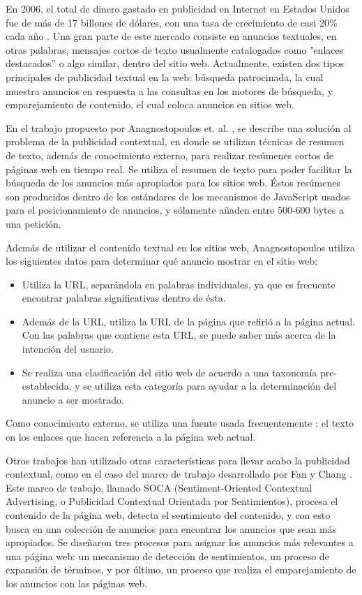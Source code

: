 En 2006, el total de dinero gastado en publicidad en Internet en
Estados Unidos fue de más de 17 billones de dólares, con una tasa de crecimiento de casi 20\%
cada año \cite{anagnostopoulos2007just}. Una gran parte de este
mercado consiste en anuncios textuales, en otras palabras, mensajes
cortos de texto usualmente catalogados como "enlaces destacados'' o
algo similar, dentro del sitio web. Actualmente, existen dos tipos
principales de publicidad textual en la web: búsqueda patrocinada, la
cual muestra anuncios en respuesta a las consultas en los motores de
búsqueda, y emparejamiento de contenido, el cual coloca anuncios en
sitios web.

En el trabajo propuesto por Anagnostopoulos
et. al. \cite{anagnostopoulos2007just}, se describe una solución al
problema de la publicidad contextual, en donde se utilizan técnicas de
resumen de texto, además de conocimiento externo, para realizar
resúmenes cortos de páginas web en tiempo real. Se utiliza el resumen
de texto para poder facilitar la búsqueda de los anuncios más
apropiados para los sitios web. Éstos resúmenes son producidos dentro
de los estándares de los mecanismos de JavaScript usados para el
posicionamiento de anuncios, y sólamente añaden entre 500-600 bytes a
una petición.

Además de utilizar el contenido textual en los sitios web,
Anagnostopoulos utiliza los siguientes datos para determinar qué
anuncio mostrar en el sitio web:

\begin{itemize}
  \item Utiliza la URL, separándola en palabras individuales, ya que
    es frecuente encontrar palabras significativas dentro de ésta.
  \item Además de la URL, utiliza la URL de la página que refirió a la
    página actual. Con las palabras que contiene esta URL, se puede
    saber más acerca de la intención del usuario.
  \item Se realiza una clasificación del sitio web de acuerdo a una
    taxonomía pre-establecida, y se utiliza esta categoría para ayudar
    a la determinación del anuncio a ser mostrado.
\end{itemize}

Como conocimiento externo, se utiliza una fuente usada frecuentemente \cite{brin1998anatomy}:
el texto en los enlaces que hacen referencia a la página web actual.

Otros trabajos han utilizado otras características para llevar acabo
la publicidad contextual, como en el caso del marco de trabajo
desarrollado por Fan y Chang \cite{fan2010sentiment}. Este marco de
trabajo, llamado SOCA (Sentiment-Oriented Contextual Advertising, o
Publicidad Contextual Orientada por Sentimientos), procesa el
contenido de la página web, detecta el sentimiento del contenido, y con
esto busca en una colección de anuncios para encontrar los anuncios
que sean más apropiados. Se diseñaron tres procesos para asignar los
anuncios más relevantes a una página web: un mecanismo de detección de
sentimientos, un proceso de expansión de términos, y por último, un
proceso que realiza el emparejamiento de los anuncios con las páginas
web.

